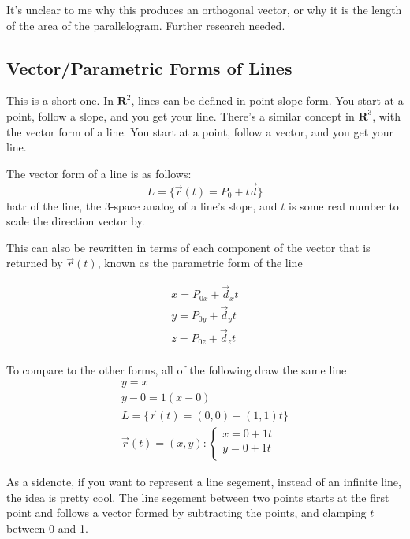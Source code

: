 \documentclass[12pt, letterpaper]{article}
\begin{document}
It's unclear to me why this produces an orthogonal vector, or why it is the length of the area of the parallelogram. Further research needed.

\subsection{Vector/Parametric Forms of Lines}

This is a short one. In $\mathbf{R}^2$, lines can be defined in point slope form. You start at a point, follow a slope, and you get your line. 
There's a similar concept in $\mathbf{R}^3$, with the vector form of a line. You start at a point, follow a vector, and you get your line.

The vector form of a line is as follows:
\begin{displaymath}
    L = \{\vec{r}(t) = P_0 + t\vec{d}\}
\end{displaymath}hatr of the line, the 3-space analog of a line's slope, and $t$ is some real number to scale the direction vector by.

This can also be rewritten in terms of each component of the vector that is returned by $\vec{r}(t)$, known as the parametric form of the line

\begin{gather*}
    x = P_{0x} + \vec{d}_xt\\
    y = P_{0y} + \vec{d}_yt\\
    z = P_{0z} + \vec{d}_zt\\
\end{gather*}


To compare to the other forms, all of the following draw the same line
\begin{gather*}
    y = x \\
    y - 0 = 1 (x - 0)\\
    L = \{\vec{r}(t) = (0, 0) + (1, 1)t\}\\
    \vec{r}(t)= (x, y): 
    \begin{cases}
        x = 0 + 1t\\
        y = 0 + 1t\\
    \end{cases}
\end{gather*}

As a sidenote, if you want to represent a line segement, instead of an infinite line, the idea is pretty cool. The line segement between two points starts at the first point and follows a vector formed by subtracting the points, and clamping $t$ between 0 and 1.
\end{document}
